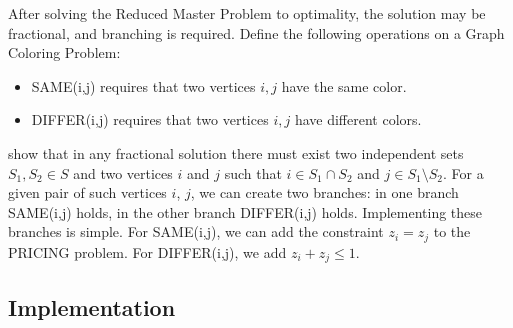 \documentclass[a4paper]{article}
\begin{document}
After solving the Reduced Master Problem to optimality, the solution may be fractional, and branching is required. Define the following operations on a Graph Coloring Problem:
\begin{itemize}
 \item SAME(i,j) requires that two vertices $i,j$ have the same color.
 \item DIFFER(i,j) requires that two vertices $i,j$ have different colors.
\end{itemize}
\citet{METR95} show that in any fractional solution there must exist two independent sets $S_1,S_2 \in S$ and two vertices $i$ and $j$ such that $i\in S_1 \cap S_2$ and $j\in S_1 \setminus S_2$. For a given pair of such vertices $i$, $j$, we can create two branches: in one branch SAME(i,j) holds, in the other branch DIFFER(i,j) holds. Implementing these branches is simple. For SAME(i,j), we can add the constraint $z_i=z_j$ to the PRICING problem. For DIFFER(i,j), we add $z_i+z_j\leq 1$. 

\subsection{Implementation}
\end{document}
